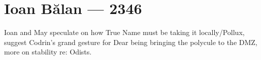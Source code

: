 \hypertarget{ioan-bux103lan-2346}{%
\chapter{Ioan Bălan — 2346}\label{ioan-bux103lan-2346}}

Ioan and May speculate on how True Name must be taking it locally/Pollux, suggest Codrin's grand gesture for Dear being bringing the polycule to the DMZ, more on stability re: Odists.
